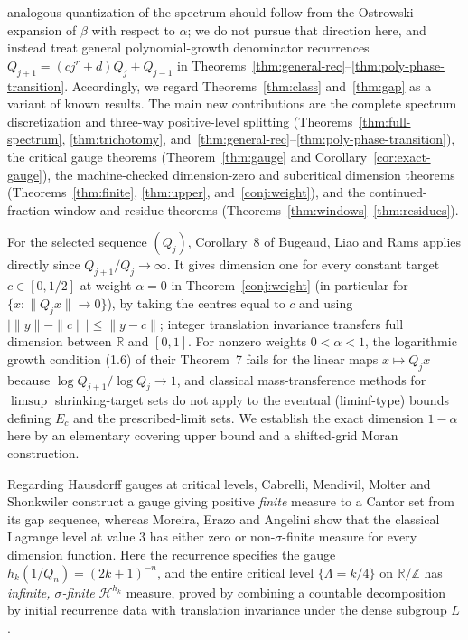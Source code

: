 \documentclass[11pt]{article}
\theoremstyle{definition}
\theoremstyle{remark}
\newcommand{\R}{\mathbb{R}}
\newcommand{\Z}{\mathbb{Z}}
\newcommand{\Lam}{\Lambda}
\begin{document}
analogous quantization of the spectrum should follow from the Ostrowski
expansion of $\beta$ with respect to $\alpha$; we do not pursue that direction
here, and instead treat general polynomial-growth denominator recurrences
$Q_{j+1}=(cj^r+d)Q_j+Q_{j-1}$ in
Theorems~\ref{thm:general-rec}--\ref{thm:poly-phase-transition}. Accordingly, we
regard Theorems~\ref{thm:class} and~\ref{thm:gap} as a variant of known results.
The main new contributions are the complete spectrum discretization and
three-way positive-level splitting (Theorems~\ref{thm:full-spectrum},
\ref{thm:trichotomy}, and~\ref{thm:general-rec}--\ref{thm:poly-phase-transition}), the critical gauge theorems
(Theorem~\ref{thm:gauge} and Corollary~\ref{cor:exact-gauge}), the machine-checked
dimension-zero and subcritical dimension theorems (Theorems~\ref{thm:finite},
\ref{thm:upper}, and~\ref{conj:weight}), and the continued-fraction window and
residue theorems (Theorems~\ref{thm:windows}--\ref{thm:residues}).

For the selected sequence $(Q_j)$, Corollary~8 of Bugeaud, Liao and Rams
\cite{BLR} applies directly since $Q_{j+1}/Q_j\to\infty$. It gives dimension
one for every constant target $c\in[0,1/2]$ at weight $\alpha=0$ in
Theorem~\ref{conj:weight} (in particular for $\{x:\|Q_jx\|\to0\}$), by taking
the centres equal to $c$ and using $|\|y\|-\|c\||\le\|y-c\|$; integer
translation invariance transfers full dimension between $\R$ and $[0,1]$. For
nonzero weights $0<\alpha<1$, the logarithmic growth condition (1.6) of their
Theorem~7 fails for the linear maps $x\mapsto Q_jx$ because
$\log Q_{j+1}/\log Q_j\to1$, and classical mass-transference methods for
$\limsup$ shrinking-target sets \cite{BV} do not apply to the eventual
(liminf-type) bounds defining $E_c$ and the prescribed-limit sets. We establish
the exact dimension $1-\alpha$ here by an elementary covering upper bound and a
shifted-grid Moran construction.

Regarding Hausdorff gauges at critical levels, Cabrelli, Mendivil, Molter and
Shonkwiler \cite[\S5, Theorem~3]{CMMS} construct a gauge giving positive
\emph{finite} measure to a Cantor set from its gap sequence, whereas Moreira,
Erazo and Angelini \cite{MEA} show that the classical Lagrange level at value
$3$ has either zero or non-$\sigma$-finite measure for every dimension function.
Here the recurrence specifies the gauge $h_k(1/Q_n)=(2k+1)^{-n}$, and the entire
critical level $\{\Lam=k/4\}$ on $\R/\Z$ has \emph{infinite, $\sigma$-finite}
$\mathcal H^{h_k}$ measure, proved by combining a countable decomposition by
initial recurrence data with translation invariance under the dense subgroup
$L$.
\end{document}
